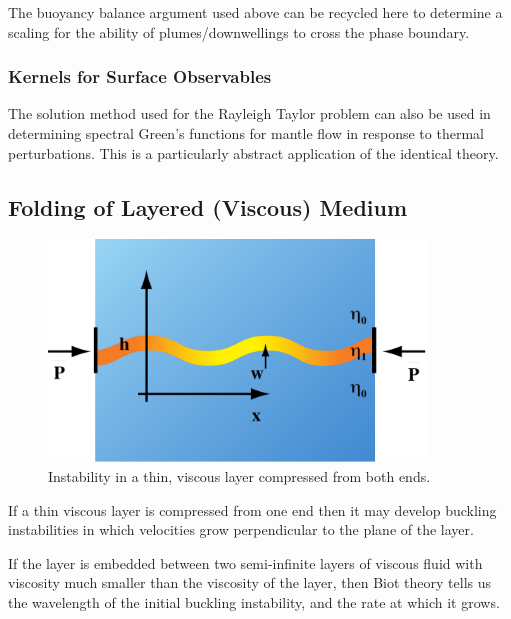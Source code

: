 \documentclass[10pt]{article}
\begin{document}
	The buoyancy balance argument used above can be recycled
	here to determine a scaling for the ability of plumes/downwellings
	to cross the phase boundary.
	
	\subsubsection{Kernels for Surface Observables}	

	The solution method used for the Rayleigh Taylor problem 
	can also be used in determining spectral Green's functions
	for mantle flow in response to thermal perturbations. This is
	a particularly abstract application of the identical theory. 
	
	\subsection{Folding of Layered (Viscous) Medium}
	
		\begin{figure}[h]
			\begin{center}
				\includegraphics[width=100mm]{Diagrams/fold}
				\caption[]{Instability in a thin, viscous layer compressed
				from both ends.
				}
				\label{fig:fold1}
			\end{center}	
		\end{figure}

	
	If a thin viscous layer is compressed from one
	end then it may develop buckling instabilities 
	in which velocities grow perpendicular to the plane of
	the layer. 
	
	If the layer is
	embedded between two semi-infinite layers
	of viscous fluid with viscosity much smaller
	than the viscosity of the layer, then Biot
	theory tells us the wavelength of the initial 
	buckling instability, and the rate at which 
	it grows.
	
\end{document}

